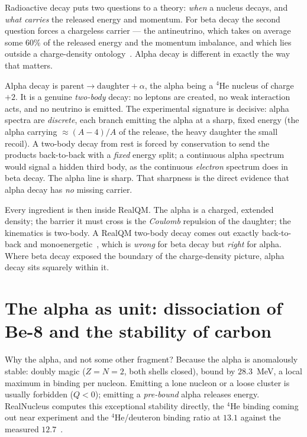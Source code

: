 \documentclass[11pt]{article}
\begin{document}
Radioactive decay puts two questions to a theory: \emph{when} a nucleus decays, and \emph{what carries} the
released energy and momentum. For beta decay the second question forces a chargeless carrier --- the
antineutrino, which takes on average some $60\%$ of the released energy and the momentum imbalance, and
which lies outside a charge-density ontology~\cite{BetaCompanion}. Alpha decay is different in exactly the
way that matters.

Alpha decay is $\mathrm{parent}\to\mathrm{daughter}+\alpha$, the alpha being a $^4$He nucleus of charge
$+2$. It is a genuine \emph{two-body} decay: no leptons are created, no weak interaction acts, and no
neutrino is emitted. The experimental signature is decisive: alpha spectra are \emph{discrete}, each branch
emitting the alpha at a sharp, fixed energy (the alpha carrying $\approx(A{-}4)/A$ of the release, the heavy
daughter the small recoil). A two-body decay from rest is forced by conservation to send the products
back-to-back with a \emph{fixed} energy split; a continuous alpha spectrum would signal a hidden third body,
as the continuous \emph{electron} spectrum does in beta decay. The alpha line is sharp. That sharpness is
the direct evidence that alpha decay has \emph{no} missing carrier.

Every ingredient is then inside RealQM. The alpha is a charged, extended density; the barrier it must cross
is the \emph{Coulomb} repulsion of the daughter; the kinematics is two-body. A RealQM two-body decay comes
out exactly back-to-back and monoenergetic~\cite{BetaCompanion}, which is \emph{wrong} for beta decay but
\emph{right} for alpha. Where beta decay exposed the boundary of the charge-density picture, alpha decay
sits squarely within it.

\section{The alpha as unit: dissociation of Be-8 and the stability of carbon}
\label{sec:ladder}

Why the alpha, and not some other fragment? Because the alpha is anomalously stable: doubly magic
($Z=N=2$, both shells closed), bound by $28.3$~MeV, a local maximum in binding per nucleon. Emitting a
lone nucleon or a loose cluster is usually forbidden ($Q<0$); emitting a \emph{pre-bound} alpha releases
energy. RealNucleus computes this exceptional stability directly, the $^4$He binding coming out near
experiment and the $^4$He/deuteron binding ratio at $13.1$ against the measured $12.7$~\cite{RealNucleus}.
\end{document}
